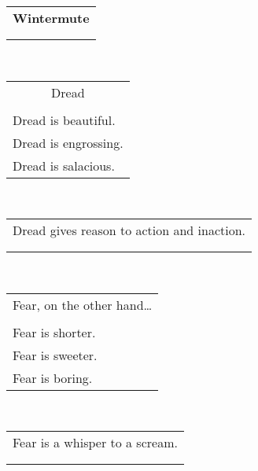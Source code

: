 \documentclass{article}
\begin{document}
\newcommand{\h}{\hspace*{2ex}}
\newcommand{\HHHH}{\hspace*{32ex}}

\begin{center}
\begin{tabular}{ll}
\multicolumn{2}{c}{\large\textbf{Wintermute}} \\
&\\\hline
&\\
\end{tabular} \\
\begin{tabular}{l}
\multicolumn{1}{c}{Dread} \\
\\
Dread is beautiful.\\
Dread is engrossing.\\
Dread is salacious.\\
\end{tabular} \\
\begin{tabular}{l}
\\
Dread gives reason to action and inaction. \\
\\
\\
\end{tabular} \\
\begin{tabular}{l}
\multicolumn{1}{c}{Fear, on the other hand\ldots{}} \\
\\
Fear is shorter. \\
Fear is sweeter. \\
Fear is boring. \\
\end{tabular}\\
\begin{tabular}{c}
\\
Fear is a whisper to a scream. \\
\\
\\
\end{tabular}\\

\end{center}
\end{document}
